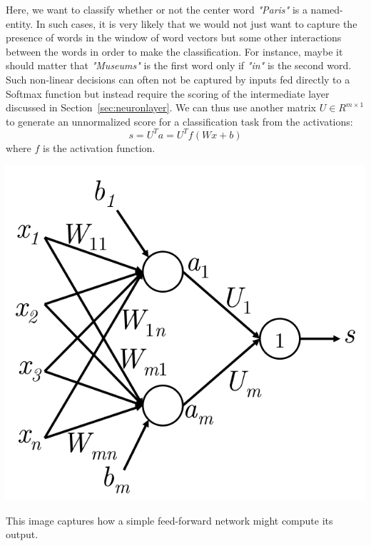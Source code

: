 \documentclass{tufte-handout}
\begin{document}

Here, we want to classify whether or not the center word \textit{"Paris"} is a named-entity. In such cases, it is very likely that we would not just want to capture the presence of words in the window of word vectors but some other interactions between the words in order to make the classification. For instance, maybe it should matter that \textit{"Museums"} is the first word only if \textit{"in"} is the second word. Such non-linear decisions can often not be captured by inputs fed directly to a Softmax function but instead require the scoring of the intermediate layer discussed in Section~\ref{sec:neuronlayer}. We can thus use another matrix $U \in R^{m\times 1}$ to generate an unnormalized score for a classification task from the activations:
$$s = U^Ta = U^T f(Wx + b)$$
where $f$ is the activation function. 

\begin{marginfigure}%
  \includegraphics[width=\linewidth]{SimpleFF}
  \caption{This image captures how a simple feed-forward network might compute its output.}
  \label{fig:SimpleFF}
\end{marginfigure}
\end{document}
